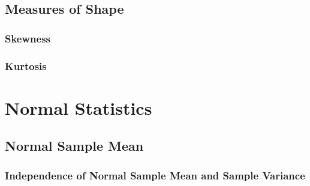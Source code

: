 \documentclass[11pt]{report} %
\begin{document}
\subsection{Measures of Shape}

\subsubsection{Skewness}

\subsubsection{Kurtosis}

\section{Normal Statistics}

\subsection{Normal Sample Mean}

\subsubsection{Independence of Normal Sample Mean and Sample Variance}
\end{document}

